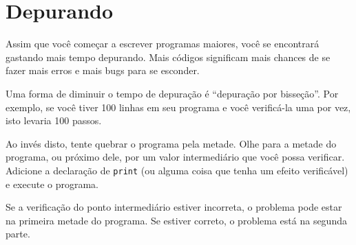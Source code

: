 \section{Depurando}


Assim que você começar a escrever programas maiores, você se encontrará
gastando mais tempo depurando. Mais códigos significam mais chances de se fazer
mais erros e mais bugs para se esconder.



Uma forma de diminuir o tempo de depuração é ``depuração por bisseção''. Por
exemplo, se você tiver 100 linhas em seu programa e você verificá-la uma por
vez, isto levaria 100 passos.


Ao invés disto, tente quebrar o programa pela metade. Olhe para a metade do
programa, ou próximo dele, por um valor intermediário que você possa verificar.
Adicione a declaração de {\tt print} (ou alguma coisa que tenha um efeito
verificável) e execute o programa.


Se a verificação do ponto intermediário estiver incorreta, o problema pode
estar na primeira metade do programa. Se estiver correto, o problema está
na segunda parte.


